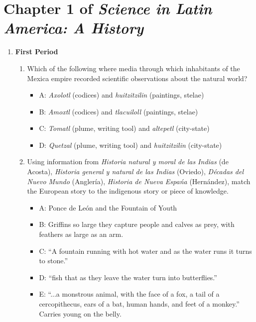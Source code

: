 \documentclass[12pt]{article}
\begin{document}
\maketitle

\section{Chapter 1 of \textit{Science in Latin America: A History}}
\small
\begin{enumerate}
\item \textbf{First Period}
\begin{enumerate}
\item Which of the following where media through which inhabitants of the Mexica empire recorded scientific observations about the natural world?
\begin{itemize}
\item A: \textit{Axolotl} (codices) and \textit{huitzitzilin} (paintings, stelae)
\item B: \textit{Amoxtl} (codices) and \textit{tlacuiloll} (paintings, stelae)
\item C: \textit{Tomatl} (plume, writing tool) and \textit{altepetl} (city-state)
\item D: \textit{Quetzal} (plume, writing tool) and \textit{huitzitzilin} (city-state)
\end{itemize}
\item Using information from \textit{Historia natural y moral de las Indias} (de Acosta), \textit{Historia general y natural de las Indias} (Oviedo), \textit{D\'{e}cadas del Nuevo Mundo} (Angler\'{i}a), \textit{Historia de Nueva Espa\'{n}a} (Hern\'{a}ndez), match the European story to the indigenous story or piece of knowledge.
\begin{itemize}
\item A: Ponce de Le\'{o}n and the Fountain of Youth
\item B: Griffins so large they capture people and calves as prey, with feathers as large as an arm.
\item C: ``A fountain running with hot water and as the water runs it turns to stone.''
\item D: ``fish that as they leave the water turn into butterflies.''
\item E: ``...a monstrous animal, with the face of a fox, a tail of a cercopithecus, ears of a bat, human hands, and feet of a monkey.'' Carries young on the belly.
\end{itemize}
\hrulefill
\begin{itemize}

\end{itemize}
\end{enumerate}
\end{enumerate}
\end{document}
